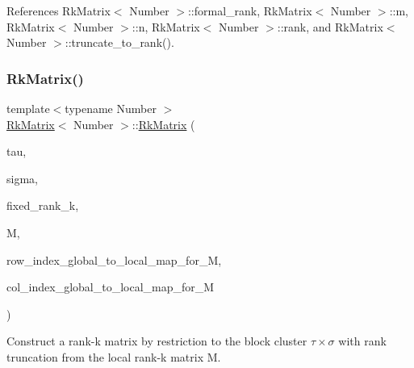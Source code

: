 References Rk\+Matrix$<$ Number $>$\+::formal\+\_\+rank, Rk\+Matrix$<$ Number $>$\+::m, Rk\+Matrix$<$ Number $>$\+::n, Rk\+Matrix$<$ Number $>$\+::rank, and Rk\+Matrix$<$ Number $>$\+::truncate\+\_\+to\+\_\+rank().

\mbox{\label{classRkMatrix_a5a2841fc6a697007fafcab2619fc5390}} 
\subsubsection{\texorpdfstring{Rk\+Matrix()}{RkMatrix()}\hspace{0.1cm}{\footnotesize\ttfamily [11/18]}}
{\footnotesize\ttfamily template$<$typename Number $>$ \\
\hyperlink{classRkMatrix}{Rk\+Matrix}$<$ Number $>$\+::\hyperlink{classRkMatrix}{Rk\+Matrix} (\begin{DoxyParamCaption}\item[{const std\+::vector$<$ types\+::global\+\_\+dof\+\_\+index $>$ \&}]{tau,  }\item[{const std\+::vector$<$ types\+::global\+\_\+dof\+\_\+index $>$ \&}]{sigma,  }\item[{const \hyperlink{classRkMatrix_add060bfc3a4cc77f858c3d6dd58cadd5}{size\+\_\+type}}]{fixed\+\_\+rank\+\_\+k,  }\item[{const \hyperlink{classRkMatrix}{Rk\+Matrix}$<$ Number $>$ \&}]{M,  }\item[{const std\+::map$<$ types\+::global\+\_\+dof\+\_\+index, size\+\_\+t $>$ \&}]{row\+\_\+index\+\_\+global\+\_\+to\+\_\+local\+\_\+map\+\_\+for\+\_\+M,  }\item[{const std\+::map$<$ types\+::global\+\_\+dof\+\_\+index, size\+\_\+t $>$ \&}]{col\+\_\+index\+\_\+global\+\_\+to\+\_\+local\+\_\+map\+\_\+for\+\_\+M }\end{DoxyParamCaption})}

Construct a rank-\/k matrix by restriction to the block cluster $\tau \times \sigma$ with rank truncation from the local rank-\/k matrix {\ttfamily M}.


